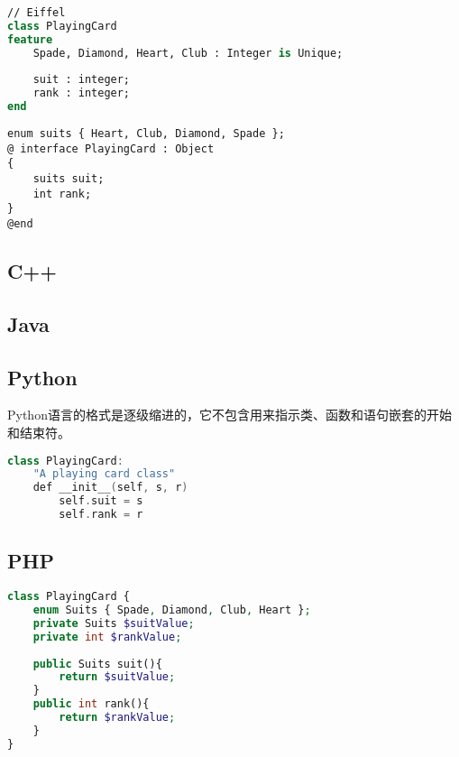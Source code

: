 \begin{lstlisting}[language=Eiffel]
// Eiffel
class PlayingCard
feature 
	Spade, Diamond, Heart, Club : Integer is Unique;
	
	suit : integer;
	rank : integer;
end
\end{lstlisting}





\begin{lstlisting}[language={[Objective]C}]
enum suits { Heart, Club, Diamond, Spade };
@ interface PlayingCard : Object
{
	suits suit;
	int rank;
}
@end
\end{lstlisting}



\subsection{C++}




\subsection{Java}





\subsection{Python}


Python语言的格式是逐级缩进的，它不包含用来指示类、函数和语句嵌套的开始和结束符。


\begin{lstlisting}[language=C++]
class PlayingCard:
	"A playing card class"
	def __init__(self, s, r)
		self.suit = s
		self.rank = r
\end{lstlisting}


\subsection{PHP}




\begin{lstlisting}[language=PHP]
class PlayingCard {
	enum Suits { Spade, Diamond, Club, Heart };
	private Suits $suitValue;
	private int $rankValue;
	
	public Suits suit(){
		return $suitValue;
	}
	public int rank(){
		return $rankValue;
	}
}
\end{lstlisting}



